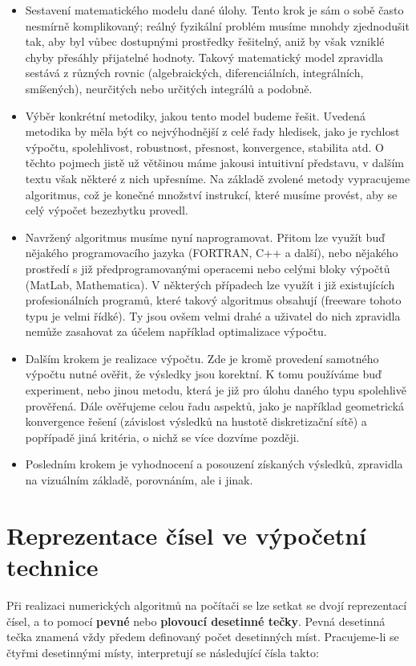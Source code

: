   \begin{itemize}
    \item Sestavení matematického modelu dané úlohy. Tento krok je sám o sobě často nesmírně
          komplikovaný; reálný fyzikální problém musíme mnohdy zjednodušit tak, aby byl vůbec
          dostupnými prostředky řešitel\-ný, aniž by však vzniklé chyby přesáhly přijatelné hodnoty.
          Takový matematický model zpravidla sestává z různých rovnic (algebraických,
          diferenciálních, integrálních, smíšených), neurčitých nebo určitých integrálů a podobně.
    \item Výběr konkrétní metodiky, jakou tento model budeme řešit. Uvedená me\-to\-di\-ka by měla
          být co nejvýhodnější z celé řady hledisek, jako je rychlost výpočtu, spolehlivost,
          robustnost, přesnost, konvergence, stabilita atd. O těchto pojmech jistě už většinou máme
          jakousi intuitivní představu, v dalším textu však některé z nich upřesníme. Na základě
          zvolené metody vypracujeme algoritmus, což je konečné množství instrukcí, které musíme
          provést, aby se celý výpočet bezezbytku provedl.
    \item Navržený algoritmus musíme nyní naprogramovat. Přitom lze využít buď nějakého
          programovacího jazyka (FORTRAN, C++ a další), nebo nějakého prostředí s již
          předprogramovanými operacemi nebo celými bloky výpočtů (MatLab, Mathematica). V některých
          případech lze využít i již existujících profesionálních programů, které takový algoritmus
          obsahují (freeware tohoto typu je velmi řídké). Ty jsou ovšem velmi drahé a uživatel do
          nich zpravidla nemůže zasahovat za účelem například optimalizace výpočtu.
    \item Dalším krokem je realizace výpočtu. Zde je kromě provedení samotného výpočtu nutné
          ověřit, že výsledky jsou korektní. K tomu používáme buď experiment, nebo jinou metodu,
          která je již pro úlohu daného typu spolehlivě prověřená. Dále ověřujeme celou řadu
          aspektů, jako je například geometrická konvergence řešení (závislost výsledků na hustotě
          diskretizační sítě) a popřípadě jiná kritéria, o nichž se více dozvíme později.
    \item Posledním krokem je vyhodnocení a posouzení získaných výsledků, zpravidla na vizuálním
          základě, porovnáním, ale i jinak.
  \end{itemize}

\section{Reprezentace čísel ve výpočetní technice}
  Při realizaci numerických algoritmů na počítači se lze setkat se dvojí reprezentací čísel, a to
  pomocí \textbf{pevné} nebo \textbf{plovoucí desetinné tečky}. Pevná desetinná tečka znamená vždy
  předem definovaný počet desetinných míst. Pracujeme-li se čtyřmi desetinnými místy, interpretují
  se následující čísla takto:

